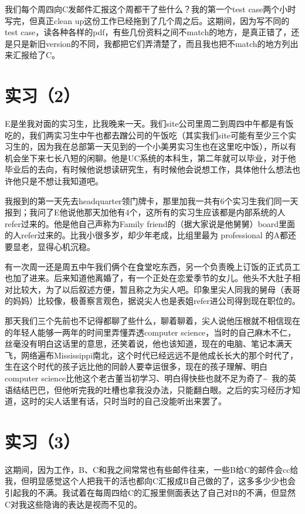 \documentclass[12pt]{book}
\begin{document}
我们每个周四向C发邮件汇报这个周都干了些什么？我的第一个test case两个小时写完，但真正clean up这份工作已经拖到了几个周之后。这期间，因为写不同的test case，读各种各样的pdf，有些几份资料之间不match的地方，是真正错了，还是只是新旧version的不同，我都把它们弄清楚了，而且我也把不match的地方列出来汇报给了C。

\section{实习（2）}
\label{sec-5-5}
E是坐我对面的实习生，比我晚来一天。我们site公司里周二到周四中午都是有饭吃的，我们两实习生中午也都去蹭公司的午饭吃（其实我们site可能有至少三个实习生的，因为我在总部第一天见到的一个小美男实习生也在这里吃中饭），所以有机会坐下来七长八短的闲聊。他是UC系统的本科生，第二年就可以毕业，对于他毕业后的去向，有时候他说想读研究生，有时候他会说想工作，具体他什么想法也许他只是不想让我知道吧。

我报到的第一天先去headquarter领门牌卡，那里加我一共有6个实习生我们同一天报到；我问了E他说他那天加他有4个，这所有的实习生应该都是内部系统的人refer过来的。他是他自己声称为Family friend的（据大家说是他舅舅）board里面的人refer过来的。比我小很多岁，却少年老成，比组里最为 professional 的A都还要显老，显得心机沉稳。

有一次周一还是周五中午我们俩个在食堂吃东西，另一个负责晚上订饭的正式员工也加了进来。后来知道他离婚了，有一个正处在恋爱季节的女儿。他头不大肚子相对比较大，为了以后叙述方便，暂且称之为尖人吧。印象里尖人同我的舅母（表哥的妈妈）比较像，极善察言观色，据说尖人也是表姐refer进公司得到现在职位的。

那天我们三个先前也不记得都聊了些什么，聊着聊着，尖人说他压根就不相信现在的年轻人能够一两年的时间里弄懂弄透computer science，当时的自己麻木不仁，丝毫没有明白这话里的意思，还笑着说，他也该知道，现在的电脑、笔记本满天飞，网络遍布Mississippi南北，这个时代已经远远不是他成长长大的那个时代了，生在这个时代的孩子远比他的同龄人要幸运很多，现在的孩子理解、明白computer science比他这个老古董当初学习、明白得快些也就不足为奇了\textasciitilde{}~我的英语结结巴巴，但他听完我的吐槽也拿我没办法，只能翻白眼。之后的实习经历才知道，这时的尖人话里有话，只时当时的自己没能听出来罢了。

\section{实习（3）}
\label{sec-5-6}

这期间，因为工作，B、C和我之间常常也有些邮件往来，一些B给C的邮件会cc给我，但明显感觉这个人把我干的活也都向C汇报成B自己做的了，这多多少少也会引起我的不满。我试着在每周四给C的汇报里侧面表达了自己对B的不满，但显然C对我这些隐诲的表达是视而不见的。
\end{document}
